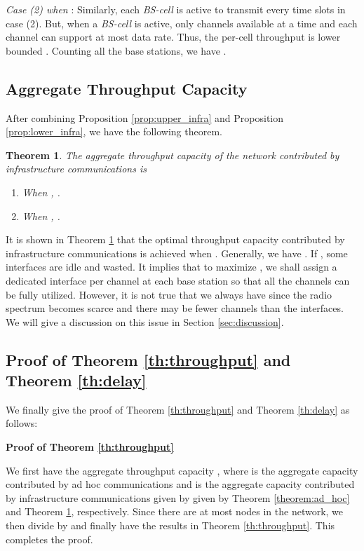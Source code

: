 \documentclass[10pt,journal]{IEEEtran}
\newtheorem{theorem}{Theorem}
\def\done{\hspace*{\fill} }
\begin{document}
\textit{Case (2) when }:
Similarly, each \textit{BS-cell} is active to transmit every  time slots in case (2). But, when a \textit{BS-cell} is active, only  channels available at a time and each channel can support at most  data rate. Thus, the per-cell throughput  is lower bounded . Counting all the  base stations, we have .
\done

\subsection{Aggregate Throughput Capacity}
\label{sec:infra:summary}
After combining Proposition \ref{prop:upper_infra} and Proposition \ref{prop:lower_infra}, 
we have the following theorem.

\begin{theorem}
\label{theorem:infra}
The aggregate throughput capacity of the network contributed by infrastructure communications is
\begin{enumerate}
\item[(1)] When , . 
\item[(2)] When , .
\end{enumerate}
\end{theorem}

It is shown in Theorem \ref{theorem:infra} that the optimal throughput capacity contributed by infrastructure communications  is achieved when . Generally, we have . If , some interfaces are idle and wasted. It implies that to maximize , we shall assign a dedicated interface per channel at each base station so that all the  channels can be fully utilized. However, it is not true that we always have  since the radio spectrum becomes scarce \cite{Akyildiz:2006} and there may be fewer channels than the interfaces. We will give a discussion on this issue in Section \ref{sec:discussion}.

\subsection{Proof of Theorem \ref{th:throughput} and Theorem \ref{th:delay}}
\label{sec:proof}

We finally give the proof of Theorem \ref{th:throughput} and Theorem \ref{th:delay} as follows:

\textbf{Proof of Theorem \ref{th:throughput}}

We first have the aggregate throughput capacity , where  is the aggregate capacity contributed by ad hoc communications and  is the aggregate capacity contributed by infrastructure communications given by given by Theorem \ref{theorem:ad_hoc} and Theorem \ref{theorem:infra}, respectively. Since there are at most  nodes in the network, we then divide  by  and finally have the results in Theorem \ref{th:throughput}. This completes the proof.
\done
\end{document}
